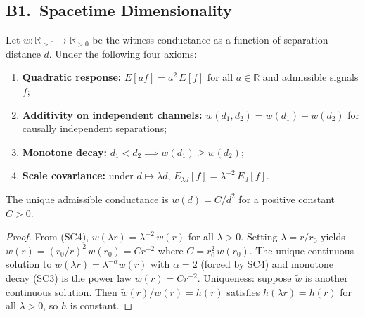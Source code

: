 \subsection{B1.\ Spacetime Dimensionality}
\label{sec:physics:dimension}

\begin{lemma}
\label{lem:conductance-exponent}
Let $w \colon \mathbb{R}_{>0} \to \mathbb{R}_{>0}$ be the witness conductance
as a function of separation distance $d$.  Under the following four axioms:
\begin{enumerate}[nosep, label=\textnormal{(SC\arabic*)}]
  \item \textbf{Quadratic response:} $E[af] = a^2\, E[f]$ for all
        $a \in \mathbb{R}$ and admissible signals $f$;
  \item \textbf{Additivity on independent channels:} $w(d_1, d_2) = w(d_1) + w(d_2)$
        for causally independent separations;
  \item \textbf{Monotone decay:} $d_1 < d_2 \implies w(d_1) \geq w(d_2)$;
  \item \textbf{Scale covariance:} under $d \mapsto \lambda d$,
        $E_{\lambda d}[f] = \lambda^{-2}\, E_d[f]$.
\end{enumerate}
The unique admissible conductance is $w(d) = C / d^2$ for a positive constant
$C > 0$.
\begin{proof}
From (SC4), $w(\lambda r) = \lambda^{-2}\, w(r)$ for all $\lambda > 0$.
Setting $\lambda = r/r_0$ yields $w(r) = (r_0/r)^2\, w(r_0) = C r^{-2}$
where $C = r_0^2\, w(r_0)$.  The unique continuous solution to
$w(\lambda r) = \lambda^{-\alpha} w(r)$ with $\alpha = 2$ (forced by SC4)
and monotone decay (SC3) is the power law $w(r) = C r^{-2}$.
Uniqueness: suppose $\tilde{w}$ is another continuous solution.  Then
$\tilde{w}(r)/w(r) = h(r)$ satisfies $h(\lambda r) = h(r)$ for all
$\lambda > 0$, so $h$ is constant.
\end{proof}
\end{lemma}

